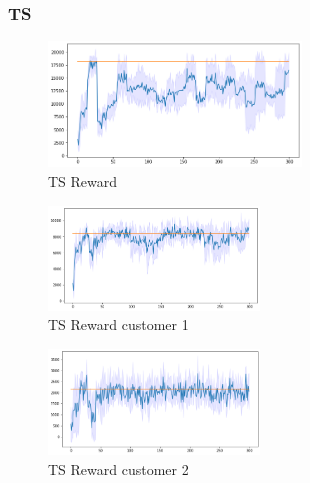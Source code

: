 \subsubsection{TS}
\begin{figure}[ht]
    \begin{center}
    \includegraphics[width=0.6\textwidth]{img/ts7.png}
    \caption{TS Reward}
    \label{fig:Reward7}
    \end{center}
\end{figure}
\begin{multicols}{2}
    \begin{figure}[H]
        \begin{center}
        \includegraphics[width=0.5\textwidth]{img/ts7_1.png}
        \caption{TS Reward customer 1}
        \label{fig:Reward71}
        \end{center}
    \end{figure}
    \columnbreak
    \begin{figure}[H]
        \begin{center}
        \includegraphics[width=0.5\textwidth]{img/ts7_2.png}
        \caption{TS Reward customer 2}
        \label{fig:Reward72}
        \end{center}
    \end{figure}
\end{multicols}
